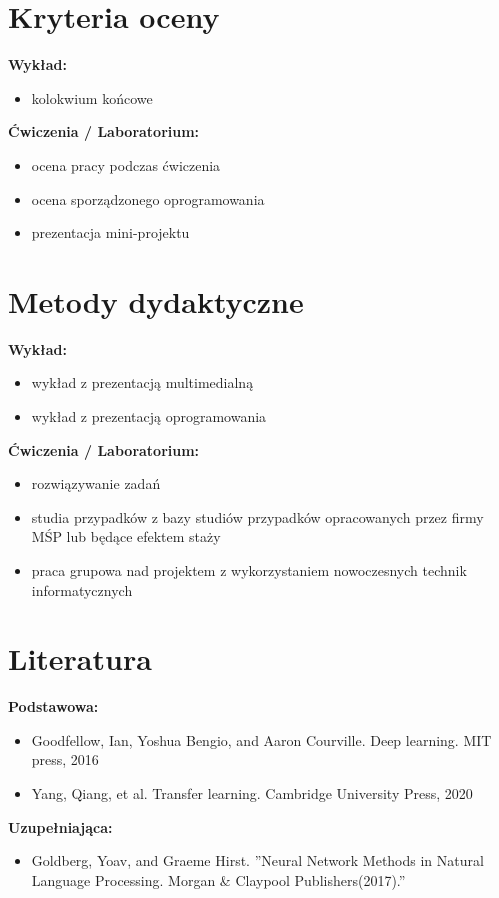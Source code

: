 \documentclass[12pt, a4paper]{article}
\begin{document}
\section{Kryteria oceny}

\textbf{Wykład:}
\begin{itemize}
  \item kolokwium końcowe
\end{itemize}
\vspace{4pt}
\textbf{Ćwiczenia / Laboratorium:}
\begin{itemize}
  \item ocena pracy podczas ćwiczenia
  \item ocena sporządzonego oprogramowania
  \item prezentacja mini-projektu
\end{itemize}


\section{Metody dydaktyczne}

\textbf{Wykład:}
\begin{itemize}
  \item wykład z prezentacją multimedialną
  \item wykład z prezentacją oprogramowania
\end{itemize}
\vspace{4pt}
\textbf{Ćwiczenia / Laboratorium:}
\begin{itemize}
  \item rozwiązywanie zadań
  \item studia przypadków z bazy studiów przypadków opracowanych przez firmy MŚP lub będące efektem staży
  \item praca grupowa nad projektem z wykorzystaniem nowoczesnych technik informatycznych
\end{itemize}
\vspace{4pt}


\section{Literatura}

\textbf{Podstawowa:}
\begin{itemize}
  \item Goodfellow, Ian, Yoshua Bengio, and Aaron Courville. Deep learning. MIT press, 2016
  \item Yang, Qiang, et al. Transfer learning. Cambridge University Press, 2020
\end{itemize}

\textbf{Uzupełniająca:}
\begin{itemize}
  \item Goldberg, Yoav, and Graeme Hirst. ''Neural Network Methods in Natural Language Processing. Morgan \& Claypool Publishers(2017).''
\end{itemize}
\end{document}
